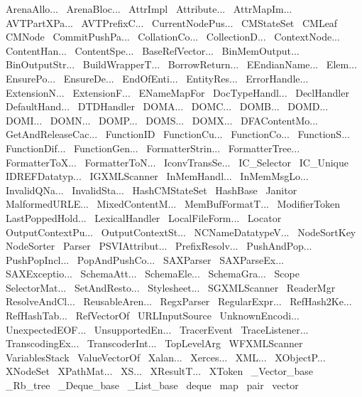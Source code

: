 ~ArenaAllo...
~ArenaBloc...
~AttrImpl
~Attribute...
~AttrMapIm...
~AVTPartXPa...
~AVTPrefixC...
~CurrentNodePus...
~CMStateSet
~CMLeaf
~CMNode
~CommitPushPa...
~CollationCo...
~CollectionD...
~ContextNode...
~ContentHan...
~ContentSpe...
~BaseRefVector...
~BinMemOutput...
~BinOutputStr...
~BuildWrapperT...
~BorrowReturn...
~EEndianName...
~Elem...
~EnsurePo...
~EnsureDe...
~EndOfEnti...
~EntityRes...
~ErrorHandle...
~ExtensionN...
~ExtensionF...
~ENameMapFor
~DocTypeHandl...
~DeclHandler
~DefaultHand...
~DTDHandler
~DOMA...
~DOMC...
~DOMB...
~DOMD...
~DOMI...
~DOMN...
~DOMP...
~DOMS...
~DOMX...
~DFAContentMo...
~GetAndReleaseCac...
~FunctionID
~FunctionCu...
~FunctionCo...
~FunctionS...
~FunctionDif...
~FunctionGen...
~FormatterStrin...
~FormatterTree...
~FormatterToX...
~FormatterToN...
~IconvTransSe...
~IC_Selector
~IC_Unique
~IDREFDatatyp...
~IGXMLScanner
~InMemHandl...
~InMemMsgLo...
~InvalidQNa...
~InvalidSta...
~HashCMStateSet
~HashBase
~Janitor
~MalformedURLE...
~MixedContentM...
~MemBufFormatT...
~ModifierToken
~LastPoppedHold...
~LexicalHandler
~LocalFileForm...
~Locator
~OutputContextPu...
~OutputContextSt...
~NCNameDatatypeV...
~NodeSortKey
~NodeSorter
~Parser
~PSVIAttribut...
~PrefixResolv...
~PushAndPop...
~PushPopIncl...
~PopAndPushCo...
~SAXParser
~SAXParseEx...
~SAXExceptio...
~SchemaAtt...
~SchemaEle...
~SchemaGra...
~Scope
~SelectorMat...
~SetAndResto...
~Stylesheet...
~SGXMLScanner
~ReaderMgr
~ResolveAndCl...
~ReusableAren...
~RegxParser
~RegularExpr...
~RefHash2Ke...
~RefHashTab...
~RefVectorOf
~URLInputSource
~UnknownEncodi...
~UnexpectedEOF...
~UnsupportedEn...
~TracerEvent
~TraceListener...
~TranscodingEx...
~TranscoderInt...
~TopLevelArg
~WFXMLScanner
~VariablesStack
~ValueVectorOf
~Xalan...
~Xerces...
~XML...
~XObjectP...
~XNodeSet
~XPathMat...
~XS...
~XResultT...
~XToken
~_Vector_base
~_Rb_tree
~_Deque_base
~_List_base
~deque
~map
~pair
~vector
